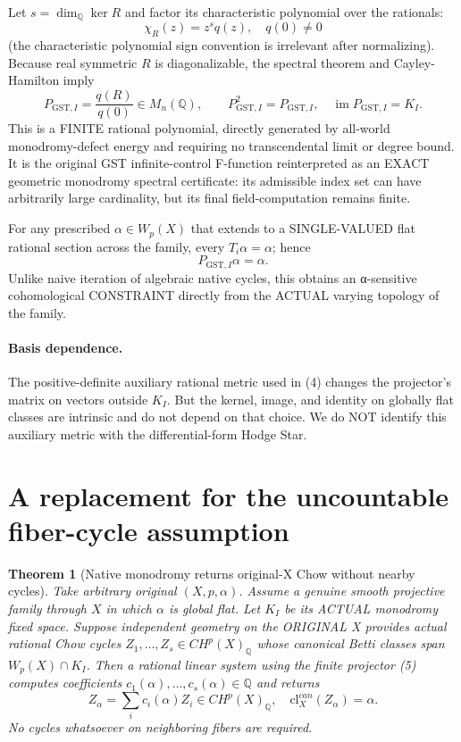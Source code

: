 \documentclass[11pt]{article}
\newtheorem{theorem}{Theorem}
\begin{document}
Let $s=\dim_{\mathbb Q}\ker R$ and
factor its characteristic polynomial
over the rationals:
\[
\chi_R(z)=z^s q(z),\quad q(0)\ne0
\]
(the characteristic polynomial sign convention
is irrelevant after normalizing).
Because real symmetric $R$ is diagonalizable,
the spectral theorem and Cayley-Hamilton imply
\[
\boxed{
P_{\mathrm{GST},I}=\frac{q(R)}{q(0)}
\in M_n(\mathbb Q),\qquad
P_{\mathrm{GST},I}^2=P_{\mathrm{GST},I},
\quad\operatorname{im}P_{\mathrm{GST},I}
=K_I.
}
\tag{5}
\]
This is a FINITE rational polynomial, directly
generated by all-world monodromy-defect energy
and requiring no transcendental limit or
degree bound. It is the original GST
infinite-control F-function reinterpreted
as an EXACT geometric monodromy spectral
certificate: its admissible index set can
have arbitrarily large cardinality, but
its final field-computation remains finite.

For any prescribed $\alpha\in W_p(X)$ that
extends to a SINGLE-VALUED flat rational
section across the family,
every $T_i\alpha=\alpha$; hence
\[
\boxed{P_{\mathrm{GST},I}\alpha=\alpha.}
\tag{6}
\]
Unlike naive iteration of algebraic native
cycles, this obtains an α-sensitive
cohomological CONSTRAINT directly from the
ACTUAL varying topology of the family.

\paragraph{Basis dependence.}
The positive-definite auxiliary rational
metric used in (4) changes the projector's
matrix on vectors outside $K_I$.
But the kernel, image, and identity on
globally flat classes are intrinsic and
do not depend on that choice. We do NOT
identify this auxiliary metric with the
differential-form Hodge Star.

\section{A replacement for the uncountable fiber-cycle assumption}

\begin{theorem}[Native monodromy returns original-X Chow without nearby cycles]
Take arbitrary original $(X,p,\alpha)$.
Assume a genuine smooth projective family
through $X$ in which $\alpha$ is global flat.
Let $K_I$ be its ACTUAL monodromy fixed space.
Suppose independent geometry on the ORIGINAL X
provides actual rational Chow cycles
$Z_1,\ldots,Z_s\in CH^p(X)_{\mathbb Q}$
whose canonical Betti classes span
$W_p(X)\cap K_I$.
Then a rational linear system using the
finite projector (5) computes coefficients
$c_1(\alpha),\ldots,c_s(\alpha)\in\mathbb Q$
and returns
\[
\boxed{
Z_\alpha=\sum_i c_i(\alpha)Z_i\in CH^p(X)_{\mathbb Q},
\quad\mathrm{cl}^{can}_X(Z_\alpha)=\alpha.
}
\tag{7}
\]
No cycles whatsoever on neighboring fibers
are required.
\end{theorem}
\end{document}
